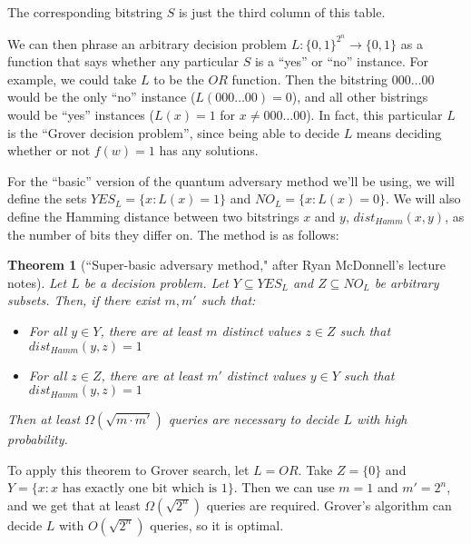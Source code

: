 \documentclass{article}
\newtheorem{thm}{Theorem}
\begin{document}
The corresponding bitstring $S$ is just the third column of this table.

We can then phrase an arbitrary decision problem $L : \{0, 1\}^{2^n} \to \{0, 1\}$ as a function that says whether any particular $S$ is a ``yes'' or ``no'' instance. For example, we could take $L$ to be the $OR$ function. Then the bitstring $000\ldots 00$ would be the only ``no'' instance ($L(000\ldots 00) = 0$), and all other bistrings would be ``yes'' instances ($L(x) = 1$ for $x \neq 000\ldots 00$). In fact, this particular $L$ is the ``Grover decision problem'', since being able to decide $L$ means deciding whether or not $f(w) = 1$ has any solutions.

For the ``basic'' version of the quantum adversary method we'll be using, we will define the sets $YES_L = \{x : L(x) = 1\}$ and $NO_L = \{x : L(x) = 0\}$. We will also define the Hamming distance between two bitstrings $x$ and $y$, $dist_{Hamm}(x, y)$, as the number of bits they differ on. The method is as follows:
\begin{thm}[``Super-basic adversary method," after Ryan McDonnell's lecture notes]
Let $L$ be a decision problem. Let $Y \subseteq YES_L$ and $Z \subseteq NO_L$ be arbitrary subsets. Then, if there exist $m, m'$ such that:
\begin{itemize}
\item[(i)] For all $y \in Y$, there are at least $m$ distinct values $z \in Z$ such that $dist_{Hamm}(y, z) = 1$
\item[(ii)] For all $z \in Z$, there are at least $m'$ distinct values $y \in Y$ such that $dist_{Hamm}(y, z) = 1$
\end{itemize}
Then at least $\Omega(\sqrt{m \cdot m'})$ queries are necessary to decide $L$ with high probability.
\end{thm}

To apply this theorem to Grover search, let $L = OR$. Take $Z = \{0\}$ and $Y = \{x : \text{$x$ has exactly one bit which is 1}\}$. Then we can use $m=1$ and $m' = 2^n$, and we get that at least $\Omega(\sqrt{2^n})$ queries are required. Grover's algorithm can decide $L$ with $O(\sqrt{2^n})$ queries, so it is optimal.
\end{document}
